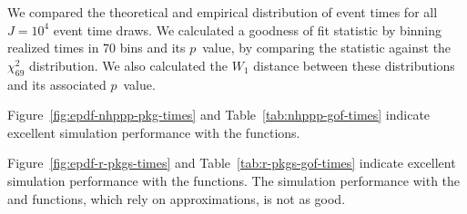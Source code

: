 \documentclass[article,nojss]{jss}\usepackage[]{graphicx}\usepackage[]{xcolor}
\begin{document}
We compared the theoretical and empirical distribution of event times for all $J=\ensuremath{10^{4}}$ event time draws. We calculated a goodness of fit statistic by binning realized times in $70$ bins and its $p$~value, by comparing the statistic against the $\chi^2_{69}$ distribution. We also calculated the $W_1$ distance between these distributions and its associated $p$~value.

Figure~\ref{fig:epdf-nhppp-pkg-times} and Table~\ref{tab:nhppp-gof-times} indicate excellent simulation performance with the  functions.

Figure~\ref{fig:epdf-r-pkgs-times} and Table~\ref{tab:r-pkgs-gof-times} indicate excellent simulation performance with the  functions. The simulation performance with the  and  functions, which rely on approximations, is not as good.







\begin{table}[ht]
\centering
{}
\caption{Goodness of fit of simulated event times with  functions for the example.} 
\label{tab:nhppp-gof-times}
\end{table}
\end{document}
